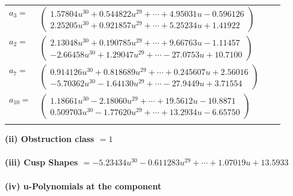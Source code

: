 \documentclass[1p]{elsarticle_modified}
\theoremstyle{definition}
\begin{document}
\begin{tabular}{m{7pt} m{180pt} m{7pt} m{180pt} }
\flushright $a_{3}=$&$\begin{pmatrix}1.57804 u^{30}+0.544822 u^{29}+\cdots+4.95031 u-0.596126\\2.25205 u^{30}+0.921857 u^{29}+\cdots+5.25234 u+1.41922\end{pmatrix}$ \\
\flushright $a_{2}=$&$\begin{pmatrix}2.13048 u^{30}+0.190785 u^{29}+\cdots+9.66763 u-1.11457\\-2.66458 u^{30}+1.29047 u^{29}+\cdots-27.0753 u+10.7100\end{pmatrix}$ \\
\flushright $a_{7}=$&$\begin{pmatrix}0.914126 u^{30}+0.818689 u^{29}+\cdots+0.245607 u+2.56016\\-5.70362 u^{30}-1.64130 u^{29}+\cdots-27.9449 u+3.71554\end{pmatrix}$ \\
\flushright $a_{10}=$&$\begin{pmatrix}1.18661 u^{30}-2.18060 u^{29}+\cdots+19.5612 u-10.8871\\0.509703 u^{30}-1.77620 u^{29}+\cdots+13.2934 u-6.65750\end{pmatrix}$\\&\end{tabular}
\flushleft \textbf{(ii) Obstruction class $= 1$}\\~\\
\flushleft \textbf{(iii) Cusp Shapes $= -5.23434 u^{30}-0.611283 u^{29}+\cdots+1.07019 u+13.5933$}\\~\\
\newpage\renewcommand{\arraystretch}{1}
\flushleft \textbf{(iv) u-Polynomials at the component}\newline \\
\end{document}
